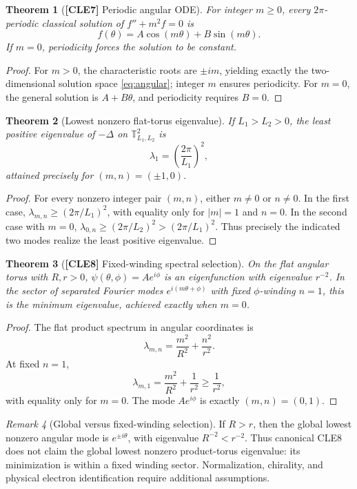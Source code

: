 \documentclass[11pt,letterpaper]{article}
\newtheorem{theorem}{Theorem}[section]
\theoremstyle{definition}
\theoremstyle{remark}
\newtheorem{remark}[theorem]{Remark}
\newcommand{\T}{\mathbb T}
\newcommand{\abs}[1]{\left\lvert#1\right\rvert}
\newcommand{\id}[1]{\textnormal{\textbf{[#1]}}}
\begin{document}
\begin{theorem}[\id{CLE7} Periodic angular ODE]\label{thm:angular}
For integer $m\ge0$, every $2\pi$-periodic classical solution of
$f''+m^2f=0$ is
\begin{equation}\label{eq:angular}
\boxed{f(\theta)=A\cos(m\theta)+B\sin(m\theta)}.
\end{equation}
If $m=0$, periodicity forces the solution to be constant.
\end{theorem}
\begin{proof}
For $m>0$, the characteristic roots are $\pm im$, yielding exactly
the two-dimensional solution space \eqref{eq:angular}; integer $m$
ensures periodicity. For $m=0$, the general solution is $A+B\theta$,
and periodicity requires $B=0$.
\end{proof}

\begin{theorem}[Lowest nonzero flat-torus eigenvalue]\label{thm:lowest}
If $L_1>L_2>0$, the least positive eigenvalue of $-\Delta$ on
$\T^2_{L_1,L_2}$ is
\begin{equation*}
\boxed{\lambda_1=\left(\frac{2\pi}{L_1}\right)^2},
\end{equation*}
attained precisely for $(m,n)=(\pm1,0)$.
\end{theorem}
\begin{proof}
For every nonzero integer pair $(m,n)$, either $m\ne0$ or $n\ne0$.
In the first case,
$\lambda_{m,n}\ge(2\pi/L_1)^2$, with equality only for
$\abs m=1$ and $n=0$. In the second case with $m=0$,
$\lambda_{0,n}\ge(2\pi/L_2)^2>(2\pi/L_1)^2$.
Thus precisely the indicated two modes realize the least positive
eigenvalue.
\end{proof}

\begin{theorem}[\id{CLE8} Fixed-winding spectral selection]\label{thm:winding}
On the flat angular torus with $R,r>0$,
$\psi(\theta,\phi)=Ae^{i\phi}$ is an eigenfunction with eigenvalue
$r^{-2}$. In the sector of separated Fourier modes
$e^{i(m\theta+\phi)}$ with fixed $\phi$-winding $n=1$, this is the
minimum eigenvalue, achieved exactly when $m=0$.
\end{theorem}
\begin{proof}
The flat product spectrum in angular coordinates is
\begin{equation*}
\lambda_{m,n}=\frac{m^2}{R^2}+\frac{n^2}{r^2}.
\end{equation*}
At fixed $n=1$,
\begin{equation*}
\lambda_{m,1}=\frac{m^2}{R^2}+\frac1{r^2}\ge\frac1{r^2},
\end{equation*}
with equality only for $m=0$. The mode $Ae^{i\phi}$ is
exactly $(m,n)=(0,1)$.
\end{proof}
\begin{remark}[Global versus fixed-winding selection]
If $R>r$, then the global lowest nonzero angular mode is
$e^{\pm i\theta}$, with eigenvalue $R^{-2}<r^{-2}$.
Thus canonical CLE8 does not claim the global lowest nonzero
product-torus eigenvalue: its minimization is within a fixed winding
sector. Normalization, chirality, and physical electron identification
require additional assumptions.
\end{remark}
\end{document}
